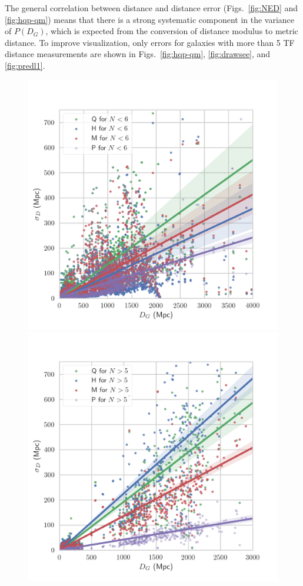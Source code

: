 \documentclass[a4paper,fleqn,usenatbib]{mnras}
\begin{document}
The general correlation between distance and distance error (Figs.~\ref{fig:NED} and \ref{fig:hqp-qm}) means that there is a strong systematic component in the variance of $P(D_G)$, which is expected from the conversion of distance modulus to metric distance. To improve visualization, only errors for galaxies with more than 5 TF distance measurements are shown in Figs.~\ref{fig:hqp-qm}, \ref{fig:drawsee}, and \ref{fig:predl1}.\\
\begin{figure}
	\includegraphics[scale=0.69]{Nlow.png}
	\includegraphics[scale=0.69]{Nhigh.png}

\end{figure}
\end{document}
